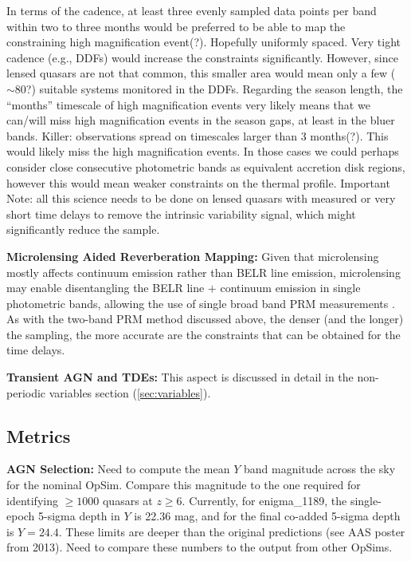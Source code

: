 In terms of the cadence, at least three evenly sampled data points per band within two to three months would be preferred to be able to map the constraining high magnification event(?). Hopefully uniformly spaced. Very tight cadence (e.g., DDFs) would increase the constraints significantly. However, since lensed quasars are not that common, this smaller area would mean only a few ($\sim80$?) suitable systems monitored in the DDFs.
%
Regarding the season length, the ``months'' timescale of high magnification events very likely means that we can/will miss high magnification events in the season gaps, at least in the bluer bands.
%
Killer: observations spread on timescales larger than 3 months(?). This would likely miss the high magnification events. In those cases we could perhaps consider close consecutive photometric bands as equivalent accretion disk regions, however this would mean weaker constraints on the thermal profile.
%
Important Note: all this science needs to be done on lensed quasars with measured or very short time delays to remove the intrinsic variability signal, which might significantly reduce the sample.

{\bf Microlensing Aided Reverberation Mapping:} Given that microlensing mostly affects continuum emission rather than BELR line emission, microlensing may enable disentangling the BELR line $+$ continuum emission in single photometric bands, allowing the use of single broad band PRM measurements \citep{SluseandTewes2014}. As with the two-band PRM method discussed above, the denser (and the longer) the sampling, the more accurate are the constraints that can be obtained for the time delays.

{\bf Transient AGN and TDEs:} This aspect is discussed in detail in the non-periodic variables section (\autoref{sec:variables}).


\subsection{Metrics}
\label{sec:\secname:metrics}


{\bf AGN Selection:} Need to compute the mean $Y$ band magnitude
across the sky for the nominal OpSim. Compare this magnitude to the
one required for identifying $\geq1000$ quasars
at $z\geq6$. Currently, for enigma_1189, the single-epoch 5-sigma
depth in $Y$ is 22.36 mag, and for the final co-added 5-sigma depth is
$Y=24.4$. These limits are deeper than the original predictions (see
AAS poster from 2013). Need to compare these numbers to the output
from other OpSims.

